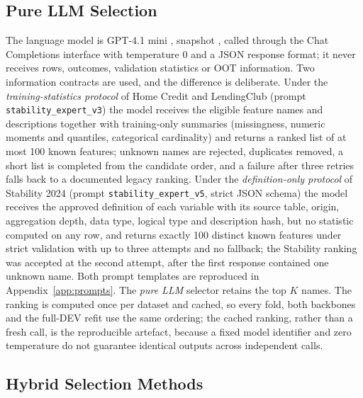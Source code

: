 \documentclass[final,5p,twocolumn]{elsarticle}
\newcommand{\Kfeat}{K}
\begin{document}
\subsection{Pure LLM Selection}
\label{subsec:llm_fs}

The language model is GPT-4.1 mini \cite{openai2025gpt41}, snapshot , called through the Chat Completions interface with temperature 0 and a JSON response format; it never receives rows, outcomes, validation statistics or OOT information. Two information contracts are used, and the difference is deliberate. Under the \emph{training-statistics protocol} of Home Credit and LendingClub (prompt \texttt{stability\_expert\_v3}) the model receives the eligible feature names and descriptions together with training-only summaries (missingness, numeric moments and quantiles, categorical cardinality) and returns a ranked list of at most 100 known features; unknown names are rejected, duplicates removed, a short list is completed from the candidate order, and a failure after three retries falls back to a documented legacy ranking. Under the \emph{definition-only protocol} of Stability 2024 (prompt \texttt{stability\_expert\_v5}, strict JSON schema) the model receives the approved definition of each variable with its source table, origin, aggregation depth, data type, logical type and description hash, but no statistic computed on any row, and returns exactly 100 distinct known features under strict validation with up to three attempts and no fallback; the Stability ranking was accepted at the second attempt, after the first response contained one unknown name. Both prompt templates are reproduced in Appendix~\ref{app:prompts}. The \emph{pure LLM} selector retains the top $\Kfeat$ names. The ranking is computed once per dataset and cached, so every fold, both backbones and the full-DEV refit use the same ordering; the cached ranking, rather than a fresh call, is the reproducible artefact, because a fixed model identifier and zero temperature do not guarantee identical outputs across independent calls.

\subsection{Hybrid Selection Methods}
\label{subsec:hybrid_fs}
\end{document}
